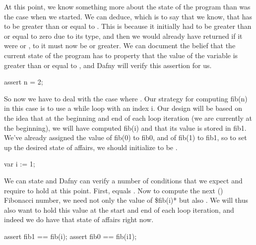 \documentclass[letterpaper,10pt,english]{sphinxmanual}
\begin{document}
At this point, we know something more about the state of the program
than was the case when we started. We can deduce, which is to say that
we know, that  has to be greater than or equal to . This is
because it initially had to be greater than or equal to zero due to
its type, and then we would already have returned if it were  or
, to it must now be  or greater. We can document the belief
that the current state of the program has to property that the value
of the variable  is greater than or equal to , and Dafny will
verify this assertion for us.

\begin{sphinxVerbatim}[commandchars=\\\{\}]
assert n \PYGZgt{}= 2;
\end{sphinxVerbatim}

So now we have to deal with the case where . Our strategy for
computing fib(n) in this case is to use a while loop with an index i.
Our design will be based on the idea that at the beginning and end of
each loop iteration (we are currently at the beginning), we will have
computed fib(i) and that its value is stored in fib1. We’ve already
assigned the value of fib(0) to fib0, and of fib(1) to fib1, so to set
up the desired state of affairs, we should initialize  to be .

\begin{sphinxVerbatim}[commandchars=\\\{\}]
var i := 1;
\end{sphinxVerbatim}

We can state and Dafny can verify a number of conditions that we
expect and require to hold at this point. First,  equals
. Now to compute the next () Fibonacci number, we need
not only the value of \$fib(i)* but also . We will thus also
want  to hold this value at the start and end of each loop
iteration, and indeed we do have that state of affairs right now.

\begin{sphinxVerbatim}[commandchars=\\\{\}]
assert fib1 == fib(i);
assert fib0 == fib(i\PYGZhy{}1);
\end{sphinxVerbatim}
\end{document}
